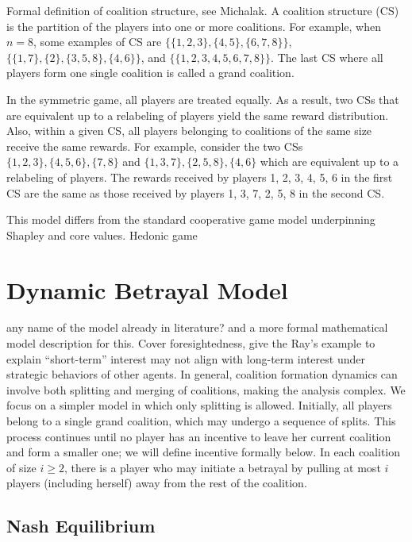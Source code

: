 \documentclass[sigconf,anonymous]{aamas}
\newcommand{\ykc}[1]{{\color{blue} #1}}
\begin{document}
\ykc{Formal definition of coalition structure, see Michalak.}
A coalition structure (CS) is the partition of the players into one or more coalitions. For example, when $n=8$, some examples of CS are $\{\{1, 2, 3\}, \{4, 5\}, \{6, 7, 8\}\}$, $\{\{1, 7\}, \{2\}, \{3, 5, 8\}, \{4, 6\}\}$, and $\{\{1, 2, 3, 4, 5, 6, 7, 8\}\}$. The last CS where all players form one single coalition is called a grand coalition. 

In the symmetric game, all players are treated equally. As a result, two CSs that are equivalent up to a relabeling of players yield the same reward distribution. Also, within a given CS, all players belonging to coalitions of the same size receive the same rewards. For example, consider the two CSs $\{1, 2, 3\}, \{4, 5, 6\}, \{7, 8\}$ and $\{1, 3, 7\}, \{2, 5, 8\}, \{4, 6\}$ which are equivalent up to a relabeling of players. The rewards received by players 1, 2, 3, 4, 5, 6 in the first CS are the same as those received by players
1, 3, 7, 2, 5, 8 in the second CS.

This model differs from the standard cooperative game model underpinning Shapley and core values. %
\ykc{Hedonic game}

\section{Dynamic Betrayal Model}

\ykc{any name of the model already in literature? and a more formal mathematical model description for this. Cover foresightedness, give the Ray's example to explain ``short-term'' interest may not align with long-term interest under strategic behaviors of other agents.}
In general, coalition formation dynamics can involve both splitting and merging of coalitions, making the analysis complex. We focus on a simpler model in which only splitting is allowed. Initially, all players belong to a single grand coalition, which may undergo a sequence of splits. This process continues until no player has an incentive to leave her current coalition and form a smaller one; we will define incentive formally below. In each coalition of size $i \geq 2$, there is a player who may initiate a betrayal by pulling at most $i$ players (including herself) away from the rest of the coalition.


\subsection{Nash Equilibrium}
\end{document}
